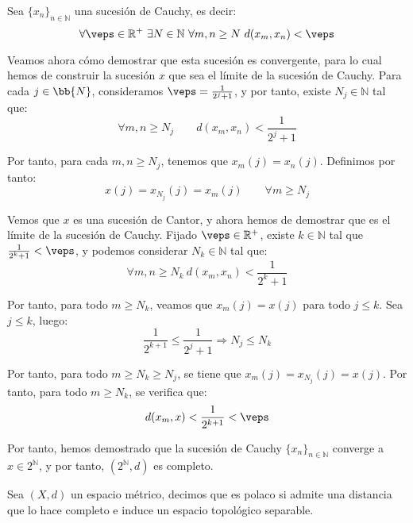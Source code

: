 \begin{ejercicio}
    Sea $\{x_n\}_{n\in \mathbb{N}}$ una sucesión de Cauchy, es decir:
    \begin{equation*}
        \forall \veps\in \mathbb{R}^+\ \exists N\in \mathbb{N}\ \forall m,n\geq N\ d(x_m,x_n) < \veps
    \end{equation*}

    Veamos ahora cómo demostrar que esta sucesión es convergente, para lo cual hemos de construir la sucesión $x$ que sea el límite de la sucesión de Cauchy. Para cada $j\in \bb{N}$, consideramos $\veps=\frac{1}{2^j+1}$, y por tanto, existe $N_j\in \mathbb{N}$ tal que:
    \begin{equation*}
        \forall m,n\geq N_j\qquad d(x_m,x_n) < \frac{1}{2^j+1}
    \end{equation*}

    Por tanto, para cada $m,n\geq N_j$, tenemos que $x_m(j)=x_n(j)$. Definimos por tanto:
    \begin{equation*}
        x(j) = x_{N_j}(j) = x_m(j) \qquad \forall m\geq N_j
    \end{equation*}

    Vemos que $x$ es una sucesión de Cantor, y ahora hemos de demostrar que es el límite de la sucesión de Cauchy. Fijado $\veps\in \mathbb{R}^+$, existe $k\in \mathbb{N}$ tal que $\frac{1}{2^k+1} < \veps$, y podemos considerar $N_k\in \mathbb{N}$ tal que:
    \begin{equation*}
        \forall m,n\geq N_k\ d(x_m,x_n) < \frac{1}{2^k+1}
    \end{equation*}

    Por tanto, para todo $m\geq N_k$, veamos que $x_m(j) = x(j)$ para todo $j\leq k$. Sea $j\leq k$, luego:
    \begin{equation*}
        \frac{1}{2^{k+1}}\leq \frac{1}{2^j+1}\Longrightarrow N_j\leq N_k
    \end{equation*}

    Por tanto, para todo $m\geq N_k\geq N_j$, se tiene que $x_m(j) = x_{N_j}(j) = x(j)$. Por tanto, para todo $m\geq N_k$, se verifica que:
    \begin{equation*}
        d(x_m,x) < \frac{1}{2^{k+1}} < \veps
    \end{equation*}

    Por tanto, hemos demostrado que la sucesión de Cauchy $\{x_n\}_{n\in \mathbb{N}}$ converge a $x\in 2^\mathbb{N}$, y por tanto, $(2^\mathbb{N},d)$ es completo.
\end{ejercicio}

\begin{definicion}[Polaco]
    Sea $(X,d)$ un espacio métrico, decimos que es polaco si admite una distancia que lo hace completo e induce un espacio topológico separable.
\end{definicion}

